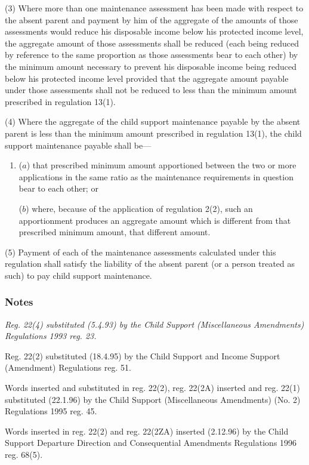 \documentclass[a4paper]{article}
\newcommand\amendment[1]{\subsubsection*{Notes}{\itshape\frenchspacing\footnotesize #1 \par\goodbreak}}
\begin{document}
(3) Where more than one maintenance assessment has been made with respect to the absent parent and payment by him of the aggregate of the amounts of those assessments would reduce his disposable income below his protected income level, the aggregate amount of those assessments shall be reduced (each being reduced by reference to the same proportion as those assessments bear to each other) by the minimum amount necessary to prevent his disposable income being reduced below his protected income level provided that the aggregate amount payable under those assessments shall not be reduced to less than the minimum amount prescribed in regulation 13(1).

(4) Where the aggregate of the child support maintenance payable by the absent parent is less than the minimum amount prescribed in regulation 13(1), the child support maintenance payable shall be---
\begin{enumerate}\item[]
($a$) that prescribed minimum amount apportioned between the two or more applications in the same ratio as the maintenance requirements in question bear to each other; or

($b$) where, because of the application of regulation 2(2), such an apportionment produces an aggregate amount which is different from that prescribed minimum amount, that different amount.
\end{enumerate}

(5) Payment of each of the maintenance assessments calculated under this regulation shall satisfy the liability of the absent parent (or a person treated as such) to pay child support maintenance.

\amendment{
Reg. 22(4) substituted (5.4.93) by the Child Support (Miscellaneous Amendments) Regulations 1993 reg. 23.

Reg. 22(2) substituted (18.4.95) by the Child Support and Income Support (Amendment) Regulations reg. 51.

Words inserted and substituted in reg. 22(2), reg. 22(2A) inserted and reg. 22(1) substituted (22.1.96) by the Child Support (Miscellaneous Amendments) (No. 2) Regulations 1995 reg. 45.

Words inserted in reg. 22(2) and reg. 22(2ZA) inserted (2.12.96) by the Child Support Departure Direction and Consequential Amendments Regulations 1996 reg. 68(5).
}
\end{document}
